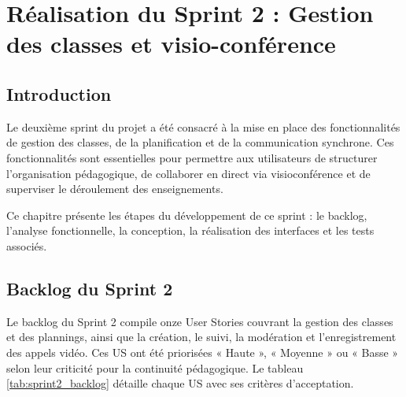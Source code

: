 \chapter{Réalisation du Sprint 2 : Gestion des classes et visio-conférence}

\section*{Introduction}

Le deuxième sprint du projet a été consacré à la mise en place des fonctionnalités de gestion des classes, de la planification et de la communication synchrone. Ces fonctionnalités sont essentielles pour permettre aux utilisateurs de structurer l'organisation pédagogique, de collaborer en direct via visioconférence et de superviser le déroulement des enseignements.

Ce chapitre présente les étapes du développement de ce sprint : le backlog, l'analyse fonctionnelle, la conception, la réalisation des interfaces et les tests associés.

\section{Backlog du Sprint 2}

Le backlog du Sprint 2 compile onze User Stories couvrant la gestion des classes et des plannings, ainsi que la création, le suivi, la modération et l’enregistrement des appels vidéo. Ces US ont été priorisées « Haute », « Moyenne » ou « Basse » selon leur criticité pour la continuité pédagogique. Le tableau \ref{tab:sprint2_backlog} détaille chaque US avec ses critères d’acceptation.

